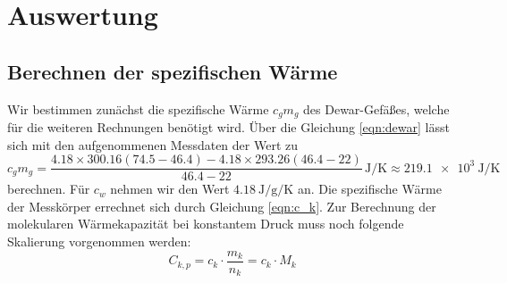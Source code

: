 \section{Auswertung}
\label{sec:Auswertung}
\subsection{Berechnen der spezifischen Wärme}
Wir bestimmen zunächst die spezifische Wärme $c_gm_g$ des Dewar-Gefäßes, welche für die weiteren Rechnungen benötigt wird.
Über die Gleichung \eqref{eqn:dewar}
lässt sich mit den aufgenommenen Messdaten der Wert zu
\begin{equation} %
    c_gm_g = \frac{4.18\times300.16(74.5-46.4)-4.18\times293.26(46.4-22)}{46.4-22} \, \si{\joule\per\kelvin} \approx \SI{219.1e3}{\joule\per\kelvin} %
\end{equation} %
berechnen.
Für $c_w$ nehmen wir den Wert $\SI{4.18}{\joule\per\g\per\kelvin}$ an\cite{Versuchsanleitung}. %
Die spezifische Wärme der Messkörper errechnet sich durch Gleichung \eqref{eqn:c_k}.
Zur Berechnung der molekularen Wärmekapazität bei konstantem Druck muss noch folgende Skalierung vorgenommen werden:
\begin{equation}
    C_{k,p}=c_k \cdot \frac{m_k}{n_k}=c_k \cdot M_k 
\end{equation}
